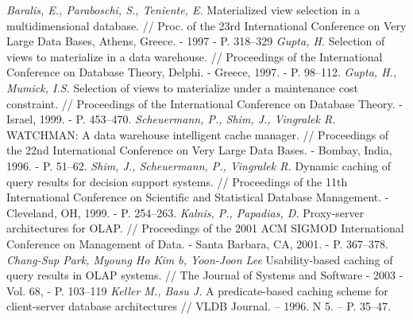 \begin{thebibliography}{9}
  \textit{Baralis, E., Paraboschi, S., Teniente, E.} Materialized view selection in a multidimensional database.
  // Proc. of the 23rd International Conference on Very Large Data Bases,
  Athens, Greece.
  - 1997
  - P. 318–329
  \textit{Gupta, H.}
  Selection of views to materialize in a data warehouse.
  // Proceedings of the International Conference on Database Theory, Delphi.
  - Greece, 1997.
  - P. 98–112.
  \textit{Gupta, H., Mumick, I.S.}
  Selection of views to materialize under a maintenance cost constraint.
  // Proceedings of the International Conference on Database Theory.
  - Israel, 1999.
  - P. 453–470.
  \textit{Scheuermann, P., Shim, J., Vingralek R.}
  WATCHMAN: A data warehouse intelligent cache manager.
  // Proceedings of the 22nd International Conference on Very Large Data Bases.
  - Bombay, India, 1996.
  - P. 51–62.
  \textit{Shim, J., Scheuermann, P., Vingralek R.}
  Dynamic caching of query results for decision support systems.
  // Proceedings of the 11th International Conference on Scientific and
  Statistical Database Management.
  - Cleveland, OH, 1999.
  - P. 254–263.
  \textit{Kalnis, P., Papadias, D.}
  Proxy-server architectures for OLAP.
  // Proceedings of the 2001 ACM SIGMOD International Conference on Management
  of Data.
  - Santa Barbara, CA, 2001.
  - P. 367–378.
  \textit{Chang-Sup Park, Myoung Ho Kim b, Yoon-Joon Lee}
  Usability-based caching of query results in OLAP systems.
  // The Journal of Systems and Software
  - 2003
  - Vol. 68, - P. 103–119
  \textit{Keller M., Basu J.}
  A predicate-based caching scheme for client-server database architectures
  // VLDB Journal. – 1996. N 5. – P. 35–47.
  
  
\end{thebibliography}
